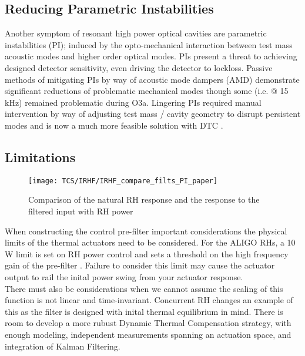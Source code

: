 \subsection{Reducing Parametric Instabilities}
Another symptom of resonant high power optical cavities are parametric instabilities (PI); induced by the opto-mechanical interaction between test mass acoustic modes and higher order optical modes. PIs present a threat to achieving designed detector sensitivity, even driving the detector to lockloss. Passive methods of mitigating PIs by way of acoustic mode dampers (AMD) demonstrate significant reductions of problematic mechanical modes though some (i.e. @ 15 kHz) remained problematic during O3a. Lingering PIs required manual intervention by way of adjusting test mass / cavity geometry to disrupt persistent modes and is now a much more feasible solution with DTC \cite{hardwick:2020}.  

\subsection{Limitations}
\begin{figure}[H]
    \centering
    \texttt{[image: TCS/IRHF/IRHF\_compare\_filts\_PI\_paper]}
    \caption{Comparison of the natural RH response and the response to the filtered input with RH power}
    \label{fig:RH_power}
\end{figure}
When constructing the control pre-filter important considerations the physical limits of the thermal actuators need to be considered. For the ALIGO RHs, a 10 W limit is set on RH power control and sets a threshold on the high frequency gain of the pre-filter \cite{dcc:rhspec}. Failure to consider this limit may cause the actuator output to rail the inital power swing from your actuator response.
\\ 
There must also be considerations when we cannot assume the scaling of this function is not linear and time-invariant.  Concurrent RH changes an example of this as the filter is designed with inital thermal equilibrium in mind. There is room to develop a more rubust Dynamic Thermal Compensation strategy, with enough modeling, independent measurements spanning an actuation space, and integration of Kalman Filtering.

